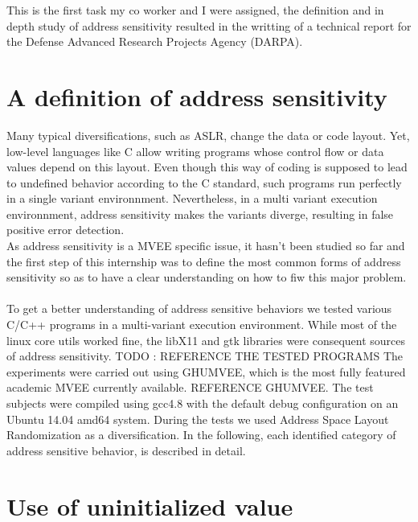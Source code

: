 \documentclass[english]{enstaPRE}
\begin{document}
This is the first task my co worker and I were assigned, the definition and in depth study of address sensitivity resulted in the
writting of a technical report for the Defense Advanced Research Projects Agency (DARPA). 

\section{A definition of address sensitivity}

Many typical diversifications, such as ASLR, change the data or code layout. Yet, low-level languages like C allow writing programs whose
control flow or data values depend on this layout. Even though this way of coding is supposed to lead to undefined behavior according to the C standard, 
such programs run perfectly in a single variant environnment. Nevertheless, in a multi variant execution environnment, address sensitivity makes the variants
diverge, resulting in false positive error detection. \\
As address sensitivity is a MVEE specific issue, it hasn't been studied so far and the first step of this internship was to define the most common forms of address
sensitivity so as to have a clear understanding on how to fiw this major problem. \\ \\
To get a better understanding of address sensitive behaviors we tested various C/C++
programs in a multi-variant execution environment. While most of the linux core utils
worked fine, the libX11 and gtk libraries were consequent sources of address sensitivity.
TODO : REFERENCE THE TESTED PROGRAMS
The experiments were carried out using GHUMVEE, which is the most fully featured academic MVEE currently available. REFERENCE GHUMVEE.
The test subjects were compiled using gcc4.8
with the default debug configuration on an Ubuntu 14.04 amd64 system. During the tests we used Address Space Layout Randomization as a diversification.
In the following, each identified category of address sensitive behavior, is described in detail.

\section{Use of uninitialized value} \label{uninit}
\end{document}
